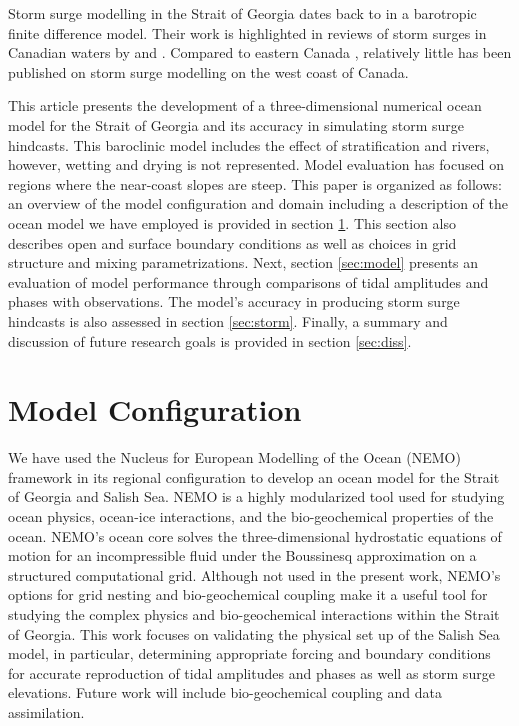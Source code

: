 \documentclass[pdftex,10pt]{article}
\begin{document}
Storm surge modelling in the Strait of Georgia dates back to \citet{crean1988mathematical} in a barotropic finite difference model. Their work is highlighted in reviews of storm surges in Canadian waters by \citet{murty1995storm} and \citet{danard2003storm}.  Compared to eastern Canada \citep{gray1984preliminary, bernier2006predicting,bobanovic2006forecasting}, relatively little has been published on storm surge modelling on the west coast of Canada. 

This article presents the development of a three-dimensional numerical ocean model for the Strait of Georgia and its accuracy in simulating storm surge hindcasts. This baroclinic model includes the effect of stratification and rivers, however, wetting and drying is not represented. Model evaluation has focused on regions where the near-coast slopes are steep.  This paper is organized as follows: an overview of the model configuration and domain including a description of the ocean model we have employed is provided in section \ref{sec:config}. This section also describes open and surface boundary conditions as well as choices in grid structure and mixing parametrizations. Next, section \ref{sec:model} presents an evaluation of model performance through comparisons of tidal amplitudes and phases with observations. The model's accuracy in producing storm surge hindcasts is also assessed in section \ref{sec:storm}. Finally, a summary and discussion of future research goals is provided in section \ref{sec:diss}.  

\section{Model Configuration}\label{sec:config}

We have used the Nucleus for European Modelling of the Ocean (NEMO) framework in its regional configuration to develop an ocean model for the Strait of Georgia and Salish Sea. NEMO is a highly modularized tool used for studying ocean physics, ocean-ice interactions, and the bio-geochemical properties of the ocean. NEMO's ocean core solves the three-dimensional hydrostatic equations of motion for an incompressible fluid under the Boussinesq approximation on a structured computational grid. Although not used in the present work, NEMO's options for grid nesting and bio-geochemical coupling make it a useful tool for studying the complex physics and bio-geochemical interactions within the Strait of Georgia. This work focuses on validating the physical set up of the Salish Sea model, in particular, determining appropriate forcing and boundary conditions for accurate reproduction of tidal amplitudes and phases as well as storm surge elevations. Future work will include bio-geochemical coupling and data assimilation. 
\end{document}
